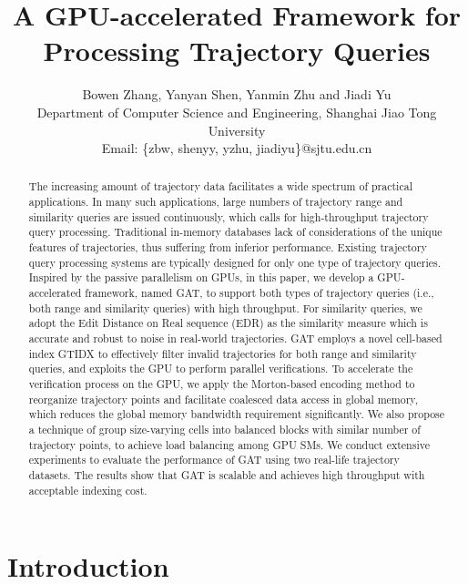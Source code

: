 \documentclass[10pt,conference,letterpaper]{IEEEtran}
\title{A GPU-accelerated Framework for Processing Trajectory Queries}
\author{%
{Bowen Zhang, Yanyan Shen, Yanmin Zhu and Jiadi Yu }\\
Department of Computer Science and Engineering, Shanghai Jiao Tong University\\
Email: \{zbw, shenyy, yzhu, jiadiyu\}@sjtu.edu.cn
}
\begin{document}
\maketitle
%
\begin{abstract}
The increasing amount of trajectory data facilitates a wide spectrum of practical applications. In many such applications, large numbers of trajectory range and similarity queries are issued continuously, which calls for high-throughput trajectory query processing. Traditional in-memory databases lack of considerations of the unique features of trajectories, thus suffering from inferior performance. Existing trajectory query processing systems are typically designed for only one type of trajectory queries.
Inspired by the passive parallelism on GPUs, in this paper, we develop a GPU-accelerated framework, named GAT, to support both types of trajectory queries (i.e., both range and similarity queries) with high throughput.
For similarity queries, we adopt the Edit Distance on Real sequence (EDR) as the similarity measure which is accurate and robust to noise in real-world trajectories.
GAT employs a novel cell-based index GTIDX to effectively filter invalid trajectories for both range and similarity queries, and exploits the GPU to perform parallel verifications.
To accelerate the verification process on the GPU, we apply the Morton-based encoding method to reorganize trajectory points and facilitate coalesced data access in global memory, which reduces the global memory bandwidth requirement significantly. We also propose a technique of group size-varying cells into balanced blocks with similar number of trajectory points, to achieve load balancing among GPU SMs.
We conduct extensive experiments to evaluate the performance of GAT using two real-life trajectory datasets. The results show that GAT is scalable and achieves high throughput with acceptable indexing cost.
\end{abstract}

%


\section{Introduction}\label{sec:intro}
\end{document}
